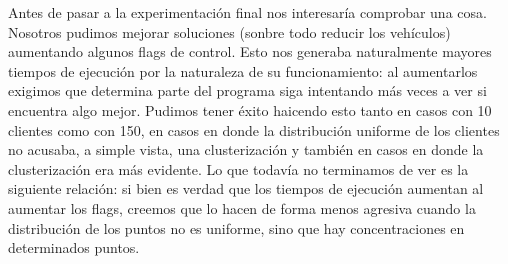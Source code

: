 \documentclass[11pt,a4paper]{article}
\begin{document}
\bigskip

Antes de pasar a la experimentación final nos interesaría comprobar una cosa. Nosotros pudimos mejorar soluciones (sonbre todo reducir los vehículos) aumentando algunos flags de control. Esto nos generaba naturalmente mayores tiempos de ejecución por la naturaleza de su funcionamiento: al aumentarlos exigimos que determina parte del programa siga intentando más veces a ver si encuentra algo mejor. Pudimos tener éxito haicendo esto tanto en casos con 10 clientes como con 150, en casos en donde la distribución uniforme de los clientes no acusaba, a simple vista, una clusterización y también en casos en donde la clusterización era más evidente. Lo que todavía no terminamos de ver es la siguiente relación: si bien es verdad que los tiempos de ejecución aumentan al aumentar los flags, creemos que lo hacen de forma menos agresiva cuando la distribución de los puntos no es uniforme, sino que hay concentraciones en determinados puntos.\\

\bigskip

 
\end{document}
